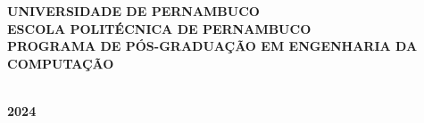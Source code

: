 \documentclass[
    a4paper,        %
    12pt,           %
    oneside,        %
    openright,      %
    final,          %
    sumario=tradicional, %
    english,        %
    french,         %
    spanish,        %
    brazil          %
    ]{abntex2}
\def\anodefesa{2024}
\def\universidade{Universidade de Pernambuco}
\def\centro{Escola Politécnica de Pernambuco}
\def\programa{Programa de Pós-Graduação em Engenharia da Computação}
\begin{document}
\renewcommand{\imprimircapa}{
    \begin{capa}
    \center{}
    {\textbf{\MakeUppercase{\universidade}}}\\
    \vspace{0.25\onelineskip}
    {\textbf{\MakeUppercase{\centro}}}\\
    \vspace{0.25\onelineskip}
    {\textbf{\MakeUppercase{\programa}}}\\

    \vspace{8\onelineskip}
    {\textbf{\MakeUppercase{\imprimirautor}}}

    \vspace{5.5\onelineskip}
    \begin{center}
    {\textbf{\MakeUppercase{\imprimirtitulo}}}
    \end{center}
    \vspace*{\fill}

    {\textbf{\MakeUppercase{\imprimirlocal}}}\\
    {\textbf{\MakeUppercase{\anodefesa}}}

    \vspace*{1cm}
    \end{capa}
}
\imprimircapa{}
\end{document}
